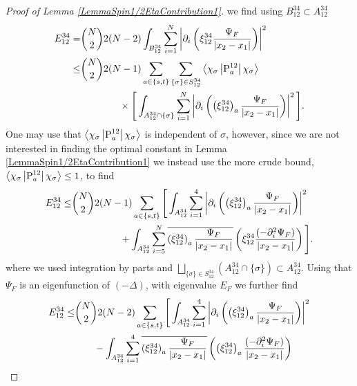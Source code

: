 \begin{proof}[Proof of Lemma \ref{LemmaSpin1/2EtaContribution1}]
we find using $ B_{12}^{34}\subset A_{12}^{34} $
\begin{equation}
\begin{aligned}
E_{12}^{34}=&\binom{N}{2}2(N-2)\int_{B_{12}^{34}}\sum_{i=1}^{N}\left\lvert \partial_i\left(\xi_{12}^{34} \frac{\Psi_F}{\left\lvert x_2-x_1 \right\rvert}\right) \right\rvert^2\\
\leq& \binom{N}{2}2(N-1)\sum_{a\in\{s,t\}}\sum_{\{\sigma\}\in S_{12}^{34}}\left\langle\chi_{\sigma}\left\lvert \operatorname{P}_a^{12}\right \rvert \chi_{\sigma}\right\rangle\\&\qquad\qquad\times\Bigg[\int_{A_{12}^{34}\cap\{\sigma\}}\sum_{i=1}^{N}\left\lvert \partial_i\left(\left(\xi_{12}^{34}\right)_a \frac{\Psi_F}{\left\lvert x_2-x_1 \right\rvert}\right) \right\rvert^2\Bigg].
\end{aligned}
\end{equation}
One may use that $ \left\langle\chi_{\sigma}\left\lvert \operatorname{P}_a^{12}\right \rvert \chi_{\sigma}\right\rangle $ is independent of $ \sigma $, however, since we are not interested in finding the optimal constant in Lemma \ref{LemmaSpin1/2EtaContribution1} we instead use the more crude bound, $ \left\langle\chi_{\sigma}\left\lvert \operatorname{P}_a^{12}\right \rvert \chi_{\sigma}\right\rangle\leq 1 $, to find
\begin{equation}
\begin{aligned}
E_{12}^{34}\leq& \binom{N}{2}2(N-1)\sum_{a\in\{s,t\}}\Bigg[\int_{A_{12}^{34}}\sum_{i=1}^{4}\left\lvert \partial_i\left(\left(\xi_{12}^{34}\right)_a \frac{\Psi_F}{\left\lvert x_2-x_1 \right\rvert}\right) \right\rvert^2 \\&\qquad\qquad\quad+\int_{A_{12}^{34}}\sum_{i=5}^{N}\overline{\left(\xi_{12}^{34}\right)_a \frac{\Psi_F}{\left\lvert x_2-x_1 \right\rvert}}\left(\xi_{12}^{34} \frac{(-\partial_i^2\Psi_F)}{\left\lvert x_2-x_1 \right\rvert}\right)\Bigg].
\end{aligned}
\end{equation}
where we used integration by parts and $ \bigsqcup_{\{\sigma\}\in S_{12}^{34}}\left(A_{12}^{34}\cap \{\sigma\}\right)\subset A_{12}^{34} $.  Using that $ \Psi_F $ is an eigenfunction of $ (-\Delta) $, with eigenvalue $ E_F $ we further find
\begin{equation}
\begin{aligned}
E_{12}^{34}\leq& \binom{N}{2}2(N-2)\sum_{a\in\{s,t\}}\Bigg[\int_{A_{12}^{34}}\sum_{i=1}^{4}\abs{\partial_i\left(\left(\xi_{12}^{34}\right)_a \frac{\Psi_F}{\abs{x_2-x_1}}\right)}^2 \\&\qquad-\int_{A_{12}^{34}}\sum_{i=1}^{4}\overline{\left(\xi_{12}^{34}\right)_a \frac{\Psi_F}{\abs{x_2-x_1}}}\left(\left(\xi_{12}^{34}\right)_a \frac{(-\partial_i^2\Psi_F)}{\abs{x_2-x_1}}\right)\\

\end{aligned}
\end{equation}
\end{proof}
